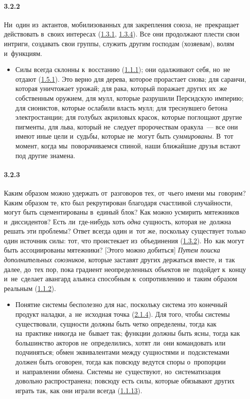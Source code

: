 \paragraph{3.2.2}\hypertarget{par:3.2.2}{} Ни~один из~актантов, мобилизованных для закрепления союза, не~прекращает действовать в~своих интересах (\hyperlink{par:1.3.1}{1.3.1}, \hyperlink{par:1.3.4}{1.3.4}). Все они продолжают плести свои интриги, создавать свои группы, служить другим господам (хозяевам), волям и~функциям. 
	\begin{itemize}
	\item 
	Силы всегда склонны к~восстанию (\hyperlink{par:1.1.1}{1.1.1}); они одалживают себя, но~не отдают (\hyperlink{par:1.5.1}{1.5.1}). Это верно для дерева, которое прорастает снова; для саранчи, которая уничтожает урожай; для рака, который поражает других их~же собственным оружием, для мулл, которые разрушили Персидскую империю; для сионистов, которые ослабили власть мулл; для треснувшего бетона электростанции; для голубых акриловых красок, которые поглощают другие пигменты, для льва, который не~следует пророчествам оракула~--- все они имеют иные цели и~судьбы, которые не~могут быть {\itshape суммированы}. В~тот момент, когда мы~поворачиваемся спиной, наши ближайшие друзья встают под другие знамена.
	\end{itemize}

\paragraph{3.2.3}\hypertarget{par:3.2.3}{} Каким образом можно удержать от~разговоров тех, от~чьего имени мы~говорим? Каким образом те, кто был рекрутирован благодаря счастливой случайности, могут быть сцементированы в~единый блок? Как можно усмирить мятежников и~диссидентов? Есть ли~где-нибудь хоть {\itshape одна} сущность, которая не~должна решать эти проблемы? Ответ всегда один и~тот же, поскольку существует только один источник силы: тот, что проистекает из~объединения (\hyperlink{par:1.3.2}{1.3.2}). Но~как могут быть ассоциированы мятежники? [Этого можно добиться] {\itshape Путем поиска дополнительных союзников}, которые заставят других держаться вместе, и~так далее, до~тех пор, пока градиент неопределенных объектов не~подойдет к~концу и~не~сделает авангард альянса способным к~сопротивлению и~таким образом реальным (\hyperlink{par:1.1.2}{1.1.2}).
	\begin{itemize}
	\item 
	Понятие системы бесполезно для нас, поскольку система это конечный продукт наладки, а~не~исходная точка (\hyperlink{par:2.1.4}{2.1.4}). Для того, чтобы системы существовали, сущности должны быть четко определены, тогда как на~практике никогда не~бывает так; функции должны быть ясны, тогда как большинство акторов не~определились, хотят ли~они командовать или подчиняться; обмен эквивалентами между сущностями и~подсистемами должен быть оговорен, тогда как повсюду ведутся споры о~пропорции и~направлении обмена. Системы не~существуют, но~систематизация довольно распространена; повсюду есть силы, которые обязывают других играть так, как они играли всегда (\hyperlink{par:1.1.13}{1.1.13}). 
	\end{itemize}

